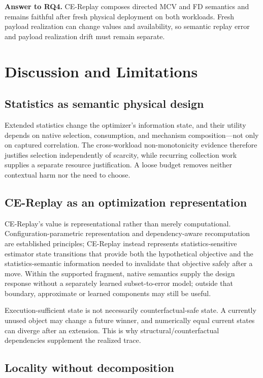 \documentclass[sigconf,nonacm]{acmart}
\begin{document}
\textbf{Answer to RQ4.} CE-Replay composes directed MCV and FD semantics and remains faithful after fresh physical deployment on both workloads. Fresh payload realization can change values and availability, so semantic replay error and payload realization drift must remain separate.

\section{Discussion and Limitations}\label{sec:8}

\subsection{Statistics as semantic physical design}

Extended statistics change the optimizer's information state, and their utility depends on native selection, consumption, and mechanism composition---not only on captured correlation. The cross-workload non-monotonicity evidence therefore justifies selection independently of scarcity, while recurring collection work supplies a separate resource justification. A loose budget removes neither contextual harm nor the need to choose.

\subsection{CE-Replay as an optimization representation}

CE-Replay's value is representational rather than merely computational. Configuration-parametric representation and dependency-aware recomputation are established principles; CE-Replay instead represents statistics-sensitive estimator state transitions that provide both the hypothetical objective and the statistics-semantic information needed to invalidate that objective safely after a move. Within the supported fragment, native semantics supply the design response without a separately learned subset-to-error model; outside that boundary, approximate or learned components may still be useful.

Execution-sufficient state is not necessarily counterfactual-safe state. A currently unused object may change a future winner, and numerically equal current states can diverge after an extension. This is why structural/counterfactual dependencies supplement the realized trace.

\subsection{Locality without decomposition}
\end{document}
